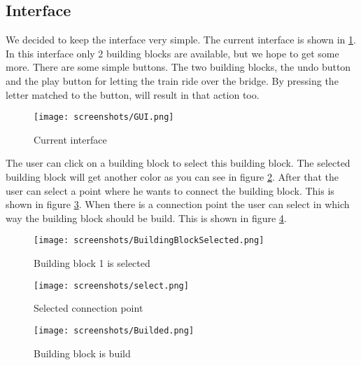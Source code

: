 \subsection{Interface}
We decided to keep the interface very simple. The current interface is shown in \ref{fig:gui}. In this interface only 2 building blocks are available, but we hope to get some more. There are some simple buttons. The two building blocks, the undo button and the play button for letting the train ride over the bridge. By pressing the letter matched to the button, will result in that action too.
\begin{figure}[H]
    \centering
    \texttt{[image: screenshots/GUI.png]}
    \caption{Current interface}
    \label{fig:gui}
\end{figure}
The user can click on a building block to select this building block. The selected building block will get another color as you can see in figure \ref{fig:bbs}. After that the user can select a point where he wants to connect the building block. This is shown in figure \ref{fig:scp}. When there is a connection point the user can select in which way the building block should be build. This is shown in figure \ref{fig:builded}.
\begin{figure}[H]
    \centering
    \texttt{[image: screenshots/BuildingBlockSelected.png]}
    \caption{Building block 1 is selected}
    \label{fig:bbs}
\end{figure}
\begin{figure}[H]
    \centering
    \texttt{[image: screenshots/select.png]}
    \caption{Selected connection point}
    \label{fig:scp}
\end{figure}
\begin{figure}[H]
    \centering
    \texttt{[image: screenshots/Builded.png]}
    \caption{Building block is build}
    \label{fig:builded}
\end{figure}